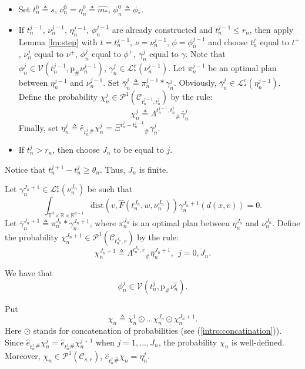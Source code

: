 \documentclass[a4paper,12pt]{article}
\newcommand{\rdp}{\mathbb{R}^{d+1}}
\newcommand{\tdr}{\mathbb{T}^{d}\times\mathbb{R}}
\newcommand{\pc}[2]{\mathcal{P}^1(\mathcal{C}_{#1,#2})}
\begin{document}
\begin{itemize}
	\item Set $t^0_n\triangleq s$, $\nu^0_n=\eta^0_n\triangleq \widehat{m_*}$, $\phi^0_n\triangleq \phi_*$. 
	\item If $t^{j-1}_n$, $\nu^{j-1}_n$, $\eta^{j-1}_n$, $\phi^{j-1}_n$ are already constructed and $t^{j-1}_n\leq r_n$, then apply Lemma \ref{lm:step} with $t=t^{j-1}_n$, $\nu=\nu^{j-1}_n$, $\phi=\phi^{j-1}_n$ and choose $t^{j}_n$  equal to $t^+$, $\nu^{j}_n$  equal to $\nu^+$, $\phi^{j}_n$  equal to $\phi^+$, $\gamma^{j}_n$  equal to $\gamma$. Note that $\phi^{j}_n\in\mathcal{V}(t^{j-1}_n,\mathrm{p}_\#\nu^{j-1}_n)$, $\gamma^j_n\in\mathcal{L}^c_*(\nu_n^{j-1})$. Let $\pi_n^{j-1}$ be an optimal plan between $\eta^{j-1}_n$ and $\nu^{j-1}_n$. Set $\bar{\gamma}^{j}_n\triangleq \pi^{j-1}_n*\gamma^j_n$. Obviously, $\bar{\gamma}^j_n\in\mathcal{L}^c_*(\eta_n^{j-1})$. 
	Define the probability $\chi^{j}_n\in\pc{t^{j-1}_n}{t^{j}_n}$ by the rule: 
	\begin{equation}\label{intro:chi_j_n}
	\chi^{j}_n\triangleq\Lambda^{t^{j-1}_n,t^{j}_n}{}_\#\bar{\gamma}^{j}_n
	\end{equation} 
	Finally, set $\eta^{j}_n\triangleq \hat{e}_{t^{j}_n}{}_\#\chi^{j}_n=\Xi^{t^{j}_n-t^{j-1}_n}{}_\#\bar{\gamma}_n^j$.
	\item If $t^{j}_n>r_n$, then choose $J_n$ to be equal to $j$.
\end{itemize}
Notice that $t^{j+1}_n-t^{j}_n\geq\theta_n$. Thus, $J_n$ is finite.

Let ${\gamma}^{J_n+1}_n\in\mathcal{L}^c_*(\nu^{J_n}_n)$ be such that
$$\int_{\tdr\times\rdp} \mathrm{dist}(v,\widehat{F}(t^{J_n}_n,w,\nu^{J_n}_n))\gamma^{J_n+1}_n(d(x,v))=0. $$ Let $\bar{\gamma}^{J_n+1}_n\triangleq\pi^{J_n}_n*\gamma^{J_n+1}_n$, where $\pi^{J_n}_n$ is an optimal plan between $\eta^{J_n}_n$ and $\nu^{J_n}_n$.	Define the probability $\chi^{J_n+1}_n\in\pc{t^{J_n}_n}{r}$ by the rule: 
\begin{equation}\label{intro:chi_J_n_plus}
\chi^{J_n+1}_n\triangleq \Lambda^{t^{J_n}_n,r}{}_\#\bar{\eta}^{J_n+1}_n,\ \ j=\overline{0,J_n}.
\end{equation} 

We have that 
$$\phi_n^j\in\mathcal{V}(t_n^j,\mathrm{p}_\#\nu_n^j).  $$


Put
\begin{equation}\label{intro:chi_n}
\chi_n\triangleq \chi^1_n\odot\ldots\chi^{J_n}_n\odot\chi^{J_n+1}_n. 
\end{equation} Here $\odot$ stands for concatenation of probabilities (see (\ref{intro:concatination})). Since $\hat{e}_{t_n^j}{}_\#\chi_n^j=\hat{e}_{t_n^j}{}_\#\chi_n^{j+1}$ when $j=1,\ldots, J_n$, the probability $\chi_n$ is well-defined. Moreover, $\chi_n\in\pc{s}{r}$, $\hat{e}_{t^j_n}{}_\#\chi_n=\eta^j_n$. 
\end{document}
